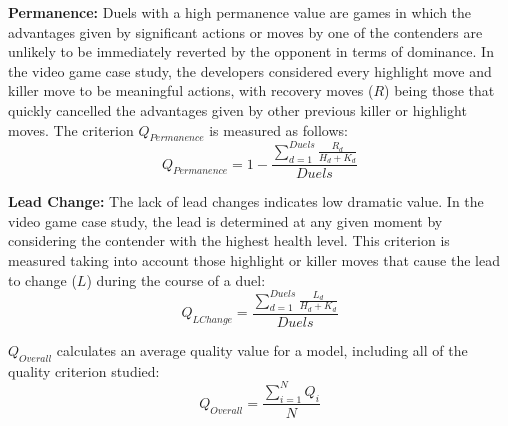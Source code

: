 {\bf Permanence:} Duels with a high permanence value are games in which the advantages given by significant actions or moves by one of the contenders are unlikely to be immediately reverted by the opponent in terms of dominance. In the video game case study, the developers considered every highlight move and killer move to be meaningful actions, with recovery moves ($R$) being those that quickly cancelled the advantages given by other previous killer or highlight moves. The criterion $Q_{Permanence}$ is measured as follows:
\begin{equation}
Q_{Permanence} =  1 - \frac{\sum\limits_{d=1}^{Duels}\frac{R_{d}}{H_{d}+K_{d}}}{Duels} 
\end{equation}

{\bf Lead Change:} The lack of lead changes indicates low dramatic value. In the video game case study, the lead is determined at any given moment by considering the contender with the highest health level. This criterion is measured taking into account those highlight or killer moves that cause the lead to change ($L$) during the course of a duel:
\begin{equation}
Q_{LChange} = \frac{\sum\limits_{d=1}^{Duels}\frac{L_{d}}{H_{d}+K_{d}}}{Duels} 
\end{equation}

$Q_{Overall}$ calculates an average quality value for a model, including all of the quality criterion studied:
\begin{equation}
Q_{Overall} = \frac{\sum\limits_{i=1}^{N}Q_{i}}{N}
\end{equation}